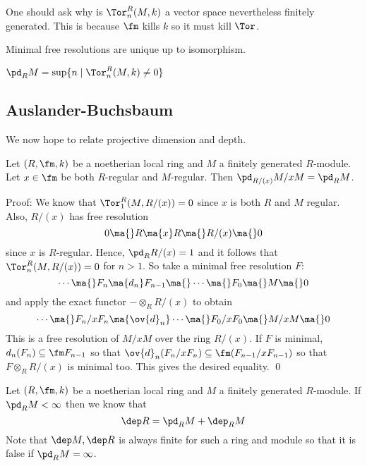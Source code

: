 \begin{rem}
One should ask why is $\Tor_n^R(M,k)$ a vector space nevertheless finitely generated. This is because $\fm$ kills $k$ so it must kill $\Tor$. 
\end{rem}

\begin{rem}
Minimal free resolutions are unique up to isomorphism.
\end{rem}

\begin{cor}
$\pd_R M=\sup\{n \;|\; \Tor_n^R(M,k) \neq 0\}$
\end{cor}

\subsection{Auslander-Buchsbaum}

We now hope to relate projective dimension and depth. 

\begin{lem}
Let $(R,\fm,k)$ be a noetherian local ring and $M$ a finitely generated $R$-module. Let $x \in \fm$ be both $R$-regular and $M$-regular. Then $\pd_{R/(x)} M/xM=\pd_R M$.
\end{lem}

\noindent Proof: We know that $\Tor_1^R(M,R/(x))=0$ since $x$ is both $R$ and $M$ regular. Also, $R/(x)$ has free resolution
\[
0 \ma{} R \ma{x} R \ma{} R/(x) \ma{} 0
\]
since $x$ is $R$-regular. Hence, $\pd_R R/(x)=1$ and it follows that $\Tor_n^R(M,R/(x))=0$ for $n>1$. So take a minimal free resolution $F$:
\[
\cdots \ma{} F_n \ma{d_n} F_{n-1} \ma{} \cdots \ma{} F_0 \ma{} M \ma{} 0
\]
and apply the exact functor $- \otimes_R R/(x)$ to obtain
\[
\cdots \ma{} F_n/xF_n \ma{\ov{d}_n} \cdots \ma{} F_0/xF_0 \ma{} M/xM \ma{} 0
\]
This is a free resolution of $M/xM$ over the ring $R/(x)$. If $F$ is minimal, $d_n(F_n) \subseteq \fm F_{n-1}$ so that $\ov{d}_n(F_n/xF_n) \subseteq \fm(F_{n-1}/xF_{n-1})$ so that $F \otimes_R R/(x)$ is minimal too. This gives the desired equality. \qed \\

\begin{thmm}
Let $(R,\fm,k)$ be a noetherian local ring and $M$ a finitely generated $R$-module. If $\pd_R M<\infty$ then we know that 
\[
\dep R= \pd_R M + \dep_R M
\]
Note that $\dep M, \dep R$ is always finite for such a ring and module so that it is false if $\pd_R M=\infty$. 
\end{thmm}


